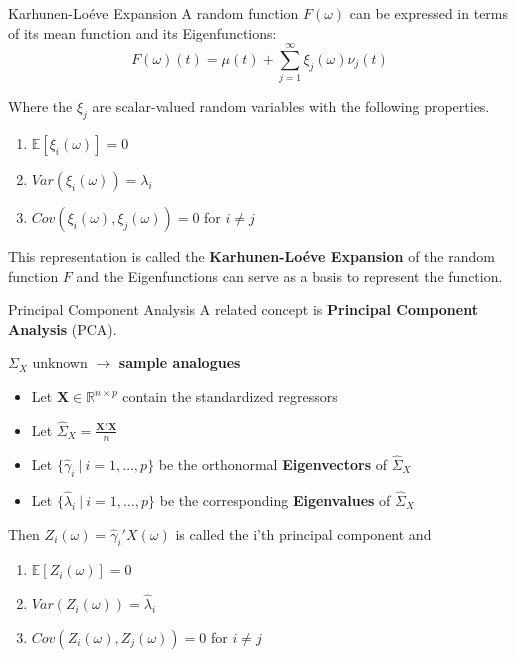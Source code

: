\documentclass{beamer}
\begin{document}
	\begin{frame}{Karhunen-Lo\'{e}ve Expansion}
		A random function $F(\omega)$ can be expressed in terms of its mean function and its Eigenfunctions:
		$$F(\omega)(t) = \mu(t) + \sum_{j = 1}^{\infty} \xi_j(\omega) \nu_j(t)$$
		
		Where the $\xi_j$ are scalar-valued random variables with the following properties.
		\begin{multicols}{2}
			\begin{enumerate}
				\item $\mathbb{E}[\xi_i(\omega)] = 0$
				\item $Var(\xi_i(\omega)) = \lambda_i$
				\item $Cov(\xi_i(\omega), \xi_j(\omega)) = 0$ for $i \neq j$
			\end{enumerate}
		\end{multicols}
		
		This representation is called the \textbf{Karhunen-Lo\'{e}ve Expansion} of the random function $F$ and the Eigenfunctions can serve as a basis to represent the function.
	\end{frame}

	\begin{frame}{Principal Component Analysis}
		A related concept is \textbf{Principal Component Analysis} (PCA).
		\vspace{0.2cm}
		
		$\Sigma_X$ unknown $\rightarrow$ \textbf{sample analogues}
	
		\begin{itemize}
			\item Let $\mathbf{X} \in \mathbb{R}^{n \times p}$ contain the standardized regressors
			\item Let $\hat{\Sigma}_X = \frac{\mathbf{X}'\mathbf{X}}{n}$
			\item Let $\{\hat{\gamma}_i \: \vert \: i = 1, \dots, p\}$ be the orthonormal \textbf{Eigenvectors} of $\hat{\Sigma}_X$
			\item Let $\{\hat{\lambda}_i \: \vert \: i = 1, \dots, p\}$ be the corresponding \textbf{Eigenvalues} of $\hat{\Sigma}_X$
		\end{itemize}
		\vspace{0.2cm} 
		
		Then $Z_i(\omega) = \hat{\gamma}_i' X(\omega)$ is called the i'th principal component and
		\begin{multicols}{2}
			\begin{enumerate}
				\item $\mathbb{E}[Z_i(\omega)] = 0$
				\item $Var(Z_i(\omega)) = \hat{\lambda}_i$
				\item $Cov(Z_i(\omega), Z_j(\omega)) = 0$ for $i \neq j$
			\end{enumerate}
		\end{multicols}
	\end{frame}
\end{document}

